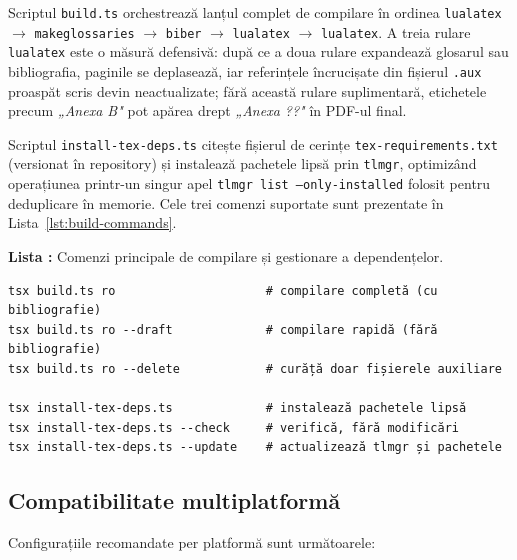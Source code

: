 Scriptul \texttt{build.ts} orchestrează lanțul complet de compilare în ordinea \texttt{lualatex} \(\rightarrow\) \texttt{makeglossaries} \(\rightarrow\) \texttt{biber} \(\rightarrow\) \texttt{lualatex} \(\rightarrow\) \texttt{lualatex}.
A treia rulare \texttt{lualatex} este o măsură defensivă: după ce a doua rulare expandează glosarul sau bibliografia, paginile se deplasează, iar referințele încrucișate din fișierul \texttt{.aux} proaspăt scris devin neactualizate; fără această rulare suplimentară, etichetele precum \textit{„Anexa B"} pot apărea drept \textit{„Anexa ??"} în PDF-ul final.

Scriptul \texttt{install-tex-deps.ts} citește fișierul de cerințe \texttt{tex-requirements.txt} (versionat în repository) și instalează pachetele lipsă prin \texttt{tlmgr}, optimizând operațiunea printr-un singur apel \texttt{tlmgr list --only-installed} folosit pentru deduplicare în memorie.
Cele trei comenzi suportate sunt prezentate în Lista~\ref{lst:build-commands}.

\label{lst:build-commands}
\par\medskip
\noindent\begin{minipage}{\linewidth}
\textbf{Lista \thecodlista:} Comenzi principale de compilare și gestionare a dependențelor.
\begin{Verbatim}[fontsize=\footnotesize]
tsx build.ts ro                     # compilare completă (cu bibliografie)
tsx build.ts ro --draft             # compilare rapidă (fără bibliografie)
tsx build.ts ro --delete            # curăță doar fișierele auxiliare

tsx install-tex-deps.ts             # instalează pachetele lipsă
tsx install-tex-deps.ts --check     # verifică, fără modificări
tsx install-tex-deps.ts --update    # actualizează tlmgr și pachetele
\end{Verbatim}
\end{minipage}
\par\medskip

\subsection{Compatibilitate multiplatformă}\label{subsec:compatibilitate-multiplatforma}

Configurațiile recomandate per platformă sunt următoarele:

